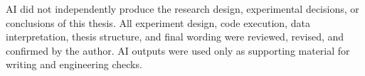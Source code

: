 \documentclass[11pt,titlepage,openany,oneside]{book}  %
\begin{document}
AI did not independently produce the research design, experimental decisions, or conclusions of this thesis. All experiment design, code execution, data interpretation, thesis structure, and final wording were reviewed, revised, and confirmed by the author. AI outputs were used only as supporting material for writing and engineering checks.
\end{document}

